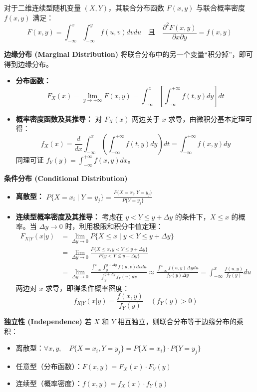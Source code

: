 \begin{新引理}[分布函数与概率密度的微积分关系]
    对于二维连续型随机变量 $(X, Y)$，其联合分布函数 $F(x,y)$ 与联合概率密度 $f(x,y)$ 满足：
    $$ F(x, y) = \int_{-\infty}^{x} \int_{-\infty}^{y} f(u, v) dv du \quad \text{且} \quad \frac{\partial^2 F(x,y)}{\partial x \partial y} = f(x,y) $$
\end{新引理}

\textbf{边缘分布 (Marginal Distribution)}
将联合分布中的另一个变量“积分掉”，即可得到边缘分布。
\begin{itemize}
    \item \textbf{分布函数：} 
    $$ F_X(x) = \lim_{y \to +\infty} F(x, y) = \int_{-\infty}^{x} \left[ \int_{-\infty}^{+\infty} f(t, y) dy \right] dt $$
    \item \textbf{概率密度函数及其推导：} 对 $F_X(x)$ 两边关于 $x$ 求导，由微积分基本定理可得：
    $$ f_X(x) = \frac{d}{dx} \int_{-\infty}^{x} \left( \int_{-\infty}^{+\infty} f(t, y) dy \right) dt = \int_{-\infty}^{+\infty} f(x, y) dy $$
    同理可证 $f_Y(y) = \int_{-\infty}^{+\infty} f(x, y) dx$。
\end{itemize}

\textbf{条件分布 (Conditional Distribution)}
\begin{itemize}
    \item \textbf{离散型：} $P\{X=x_i \mid Y=y_j\} = \frac{P\{X=x_i, Y=y_j\}}{P\{Y=y_j\}}$
    \item \textbf{连续型概率密度及其推导：} 考虑在 $y < Y \le y + \Delta y$ 的条件下，$X \le x$ 的概率。当 $\Delta y \to 0$ 时，利用极限和积分中值定理：
    $$ 
    \begin{aligned}
    F_{X|Y}(x|y) &= \lim_{\Delta y \to 0} P\{X \le x \mid y < Y \le y + \Delta y\} \\
    &= \lim_{\Delta y \to 0} \frac{P\{X \le x, y < Y \le y + \Delta y\}}{P\{y < Y \le y + \Delta y\}} \\
    &= \lim_{\Delta y \to 0} \frac{\int_{-\infty}^{x} \int_{y}^{y+\Delta y} f(u, v) dv du}{\int_{y}^{y+\Delta y} f_Y(v) dv} \approx \frac{\int_{-\infty}^{x} f(u, y) \Delta y du}{f_Y(y) \Delta y} = \int_{-\infty}^{x} \frac{f(u, y)}{f_Y(y)} du
    \end{aligned}
    $$
    两边对 $x$ 求导，即得条件概率密度：
    $$ f_{X|Y}(x|y) = \frac{f(x, y)}{f_Y(y)} \quad (f_Y(y) > 0) $$
\end{itemize}

\textbf{独立性 (Independence)}
若 $X$ 和 $Y$ 相互独立，则联合分布等于边缘分布的乘积：
\begin{itemize}
    \item 离散型：$\forall x, y, \quad P\{X=x_i, Y=y_j\} = P\{X=x_i\} \cdot P\{Y=y_j\}$
    \item 任意型（分布函数）：$F(x, y) = F_X(x) \cdot F_Y(y)$
    \item 连续型（概率密度）：$f(x, y) = f_X(x) \cdot f_Y(y)$
\end{itemize}


